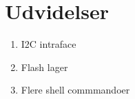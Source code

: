 
\section{Udvidelser}

\begin{enumerate}
	\item I2C intraface
	\item Flash lager
	\item Flere shell commmandoer
\end{enumerate}